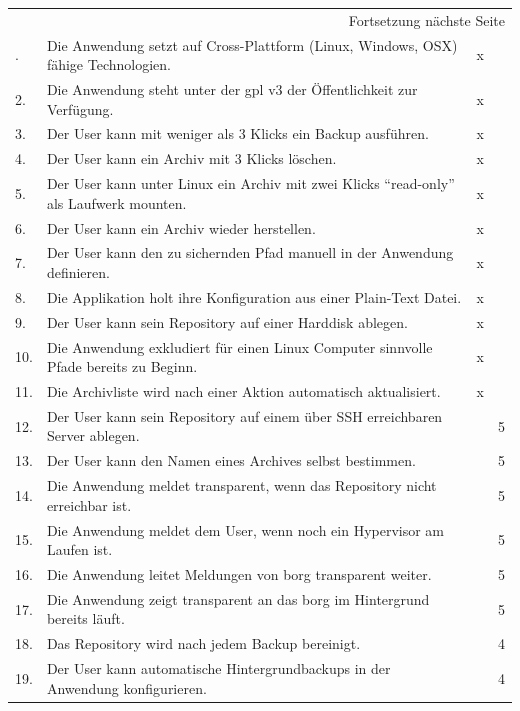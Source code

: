 \begin{longtable}{|p{1cm}|p{9cm}|p{1.5cm}|p{2cm}|}
\hline
\endhead
\hline\multicolumn{4}{r}{Fortsetzung nächste Seite} \\
\endfoot
\endlastfoot
\hline
1. & Die Anwendung setzt auf Cross-Plattform (Linux, Windows, OSX) fähige Technologien. & x & \\
\hline
2. & Die Anwendung steht unter der \gls{gpl} v3 der Öffentlichkeit zur Verfügung. & x & \\
\hline
3. & Der User kann mit weniger als 3 Klicks ein Backup ausführen. & x & \\
\hline
4. & Der User kann ein Archiv mit 3 Klicks löschen. & x & \\
\hline
5. & Der User kann unter Linux ein Archiv mit zwei Klicks "`read-only"' als Laufwerk mounten. & x & \\
\hline
6. & Der User kann ein Archiv wieder herstellen. & x & \\
\hline
7. & Der User kann den zu sichernden Pfad manuell in der Anwendung definieren. & x & \\
\hline
8. & Die Applikation holt ihre Konfiguration aus einer Plain-Text Datei. & x & \\
\hline
9. & Der User kann sein Repository auf einer Harddisk ablegen. & x & \\
\hline
10. & Die Anwendung exkludiert für einen Linux Computer sinnvolle Pfade bereits zu Beginn. & x & \\
\hline
11. & Die Archivliste wird nach einer Aktion automatisch aktualisiert. & x & \\
\hline
12. & Der User kann sein Repository auf einem über SSH erreichbaren Server ablegen. &  & 5\\
\hline
13. & Der User kann den Namen eines Archives selbst bestimmen. &  & 5\\
\hline
14. & Die Anwendung meldet transparent, wenn das Repository nicht erreichbar ist. &  & 5\\
\hline
15. & Die Anwendung meldet dem User, wenn noch ein Hypervisor am Laufen ist. &  & 5\\
\hline
16. & Die Anwendung leitet Meldungen von \gls{borg} transparent weiter. &  & 5\\
\hline
17. & Die Anwendung zeigt transparent an das \gls{borg} im Hintergrund bereits läuft. &  & 5\\
\hline
18. & Das Repository wird nach jedem Backup bereinigt. &  & 4\\
\hline
19. & Der User kann automatische Hintergrundbackups in der Anwendung konfigurieren. &  & 4\\

\end{longtable}
